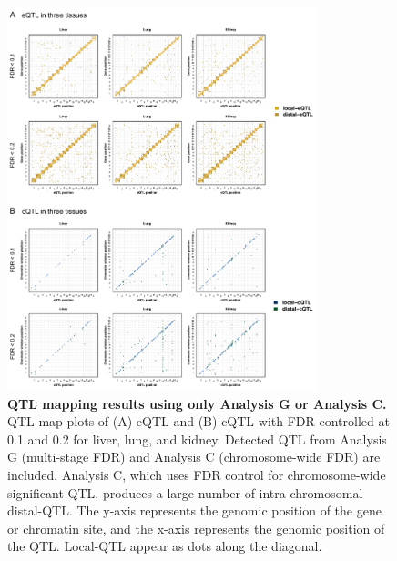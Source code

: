 \documentclass[10pt,letterpaper,twoside]{article}
\begin{document}
\clearpage

\begin{figure}[hp]
\renewcommand{\familydefault}{\sfdefault}\normalfont
\centering
\includegraphics[width=0.8\textwidth, trim={0in 0in 0in 0in}, clip]{figs/qtl_map_supplemental.pdf}
\caption{\textbf{QTL mapping results using only Analysis G or Analysis C.} 
QTL map plots of (A) eQTL and (B) cQTL with FDR controlled at 0.1 and 0.2 for liver, lung, and kidney. Detected QTL from Analysis G (multi-stage FDR) and Analysis C (chromosome-wide FDR) are included. Analysis C, which uses FDR control for chromosome-wide significant QTL, produces a large number of intra-chromosomal distal-QTL. The y-axis represents the genomic position of the gene or chromatin site, and the x-axis represents the genomic position of the QTL. Local-QTL appear as dots along the diagonal.
\label{fig:grid_fdr_plot}}
\end{figure}

\clearpage
\end{document}
